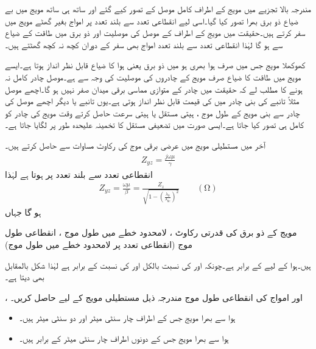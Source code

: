 مندرجہ بالا تجزیے میں مویج کے اطراف کامل موصل کے تصور کیے گئے اور ساتھ ہی ساتھ مویج میں بے ضیاع ذو برق بھرا تصور کیا گیا۔اسی لیے انقطاعی تعدد سے بلند تعدد پر امواج بغیر گھٹے مویج میں سفر کرتے ہیں۔حقیقت میں مویج کے اطراف کے موصل کی موصلیت اور ذو برق میں طاقت کے ضیاع سے   ہو گا لہٰذا انقطاعی تعدد سے بلند تعدد  امواج بھی سفر کے دوران کچھ نہ کچھ گھٹتے ہیں۔

کھوکھلا مویج جس میں صرف ہوا بھری ہو میں ذو برق یعنی ہوا کا ضیاع  قابل نظر انداز ہوتا ہے۔ایسے مویج میں طاقت کا ضیاع صرف مویج کے چادروں کی موصلیت کی وجہ سے  ہے۔موصل چادر کامل نہ ہونے کا مطلب لے کہ حقیقت میں چادر کے متوازی مماسی  برقی میدان  صفر نہیں ہو گا۔اچھے موصل مثلاً تانبے کی بنی چادر میں  کی قیمت قابل نظر انداز ہوتی ہے۔یوں تانبے یا دیگر اچھے موصل کی چادر سے بنی مویج کے طول موج ، ہیتی مستقل  یا ہیتی سرعت  حاصل کرتے وقت مویج کی چادر کو کامل ہی تصور کیا جاتا ہے۔ایسی صورت میں تضعیفی مستقل  کا تخمینہ  علیحدہ طور پر لگایا جاتا ہے۔

آخر میں مستطیلی مویج میں عرضی برقی موج کی رکاوٹ  مساوات  سے حاصل کرتے ہیں۔
\begin{align}
Z_{yz}=\frac{j\omega \mu}{\gamma}
\end{align} 
انقطاعی تعدد سے بلند تعدد پر  ہوتا ہے لہٰذا
\begin{align}\label{مساوات_مویج_عرضی_برقی_رکاوٹ_حتمی}
Z_{yz}=\frac{\omega \mu}{\beta}=\frac{Z_z}{\sqrt{1-\left(\frac{\lambda_0}{\lambda_{0c}}\right)^2}} \quad \quad (\si{\ohm})
\end{align} 
ہو گا جہاں
\begin{description}
 مویج کے ذو برق کی قدرتی رکاوٹ ،
 لامحدود خطے میں طول موج ،
 انقطاعی طول موج (انقطاعی تعدد پر لامحدود خطے میں طول موج)
\end{description}
ہیں۔ہوا کے لیے  کے برابر ہے۔چونکہ  اور  کی نسبت بالکل  اور  کی نسبت  کے برابر ہے لہٰذا شکل    بالمقابل  بھی دیتا ہے۔

،  اور   امواج کی انقطاعی طول موج مندرجہ ذیل مستطیلی مویج کے لیے حاصل کریں۔
\begin{itemize}
\item
ہوا سے بھرا مویج جس کے اطراف  چار سنٹی میٹر اور دو سنٹی میٹر ہیں۔
\item
ہوا سے بھرا مویج جس کے دونوں اطراف  چار سنٹی میٹر کے برابر ہیں۔
\end{itemize} 

